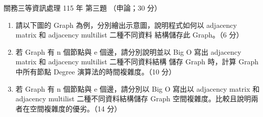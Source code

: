 \begin{pastexam}[label={px:gw3-115-ds-03}]{關務三等資訊處理 115 年 第三題}
（申論；30 分）

\begin{enumerate}[leftmargin=2.6em, labelsep=0.4em]
\item[㈠] 請以下圖的 Graph 為例，分別繪出示意圖，說明程式如何以 adjacency matrix 和 adjacency multilist 二種不同資料
結構儲存此 Graph。（6 分）
\begin{center}
\end{center}
\item[㈡] 若 Graph 有 n 個節點與 e 個邊，請分別說明並以 Big O 寫出 adjacency matrix 和 adjacency multilist 二種不同資料結構
儲存 Graph 時，計算 Graph 中所有節點 Degree 演算法的時間複雜度。（10 分）
\item[㈢] 若 Graph 有 n 個節點與 e 個邊，請分別以 Big O 寫出以 adjacency matrix 和 adjacency multilist 二種不同資料結構儲存
Graph 空間複雜度。比較且說明兩者在空間複雜度的優劣。（14 分）
\end{enumerate}
\end{pastexam}

